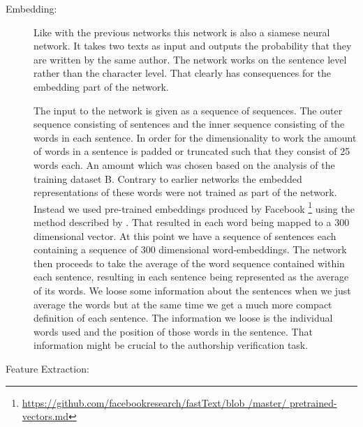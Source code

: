 \begin{description}

    \item[Embedding:]

        Like with the previous networks this network is also a siamese neural
        network. It takes two texts as input and outputs the probability that
        they are written by the same author. The network works on the sentence
        level rather than the character level. That clearly has consequences for
        the embedding part of the network.

        The input to the network is given as a sequence of sequences. The
        outer sequence consisting of sentences and the inner sequence
        consisting of the words in each sentence. In order for the
        dimensionality to work the amount of words in a sentence is padded
        or truncated such that they consist of 25 words each. An amount
        which was chosen based on the analysis of the training dataset
        \gls{B}. Contrary to earlier networks the embedded representations
        of these words were not trained as part of the network.
        Instead we used pre-trained embeddings produced by Facebook
        \footnote{\url{https://github.com/facebookresearch/fastText/blob
        /master/ pretrained-vectors.md}} using the method described by
        \citet{bojanowski2016enriching}. That resulted in each word being
        mapped to a 300 dimensional vector. At this point we have a sequence of
        sentences each containing a sequence of 300 dimensional word-embeddings.
        The network then proceeds to take the average of the word sequence
        contained within each sentence, resulting in each sentence being
        represented as the average of its words. We loose some information about
        the sentences when we just average the words but at the same time we get
        a much more compact definition of each sentence. The information we
        loose is the individual words used and the position of those words in
        the sentence. That information might be crucial to the authorship
        verification task.

    \item[Feature Extraction:]


\end{description}

